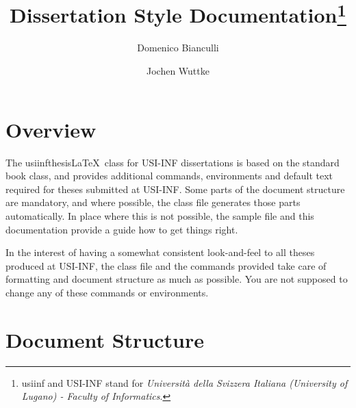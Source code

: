\documentclass{article}
\author{ Domenico Bianculli \and Jochen Wuttke}
\title{\clsusiinf Dissertation Style
  Documentation\footnote{\textsf{usiinf} and USI-INF
  stand for \emph{Universit\`a della Svizzera Italiana (University of
    Lugano) - Faculty of Informatics}.}}
\newcommand{\clsusiinf}{\textsf{usiinfthesis}\xspace}
\begin{document}
\maketitle

\section{Overview}

The \clsusiinf\LaTeX\ class for USI-INF dissertations is based on the standard
\textsf{book} class, and provides additional commands, environments
and default text required for theses submitted at USI-INF.
Some parts of the document structure are mandatory, and where
possible, the class file generates those parts automatically. In place
where this is not possible, the sample file and this documentation
provide a guide how to get things right.

In the interest of having a somewhat consistent look-and-feel to all
theses produced at USI-INF, the class file and the commands
provided take care of formatting and document structure as much as
possible. You are not supposed to change any of these commands or
environments. 

\section{Document Structure}
\end{document}
